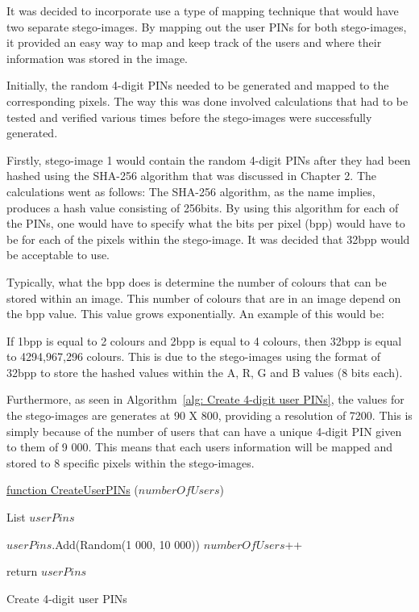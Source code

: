 It was decided to incorporate use a type of mapping technique that would have two separate stego-images. By mapping out the user PINs for both stego-images, it provided an easy way to map and keep track of the users and where their information was stored in the image. 

Initially, the random 4-digit PINs needed to be generated and mapped to the corresponding pixels. The way this was done involved calculations that had to be tested and verified various times before the stego-images were successfully generated. 

Firstly, stego-image 1 would contain the random 4-digit PINs after they had been hashed using the SHA-256 algorithm that was discussed in Chapter 2. The calculations went as follows:
The SHA-256 algorithm, as the name implies, produces a hash value consisting of 256bits. 
By using this algorithm for each of the PINs, one would have to specify what the bits per pixel (bpp) would have to be for each of the pixels within the stego-image. It was decided that 32bpp would be acceptable to use. 

Typically, what the bpp does is determine the number of colours that can be stored within an image. This number of colours that are in an image depend on the bpp value. This value grows exponentially. An example of this would be: 

If 1bpp is equal to 2 colours and 2bpp is equal to 4 colours, then 32bpp is equal to 4294,967,296 colours. This is due to the stego-images using the format of 32bpp to store the hashed values within the A, R, G and B values (8 bits each).

Furthermore, as seen in Algorithm~\ref{alg: Create 4-digit user PINs}, the values for the stego-images are generates at 90 X 800, providing a resolution of 7200. This is simply because of the number of users that can have a unique 4-digit PIN given to them of 9 000. This means that each users information will be mapped and stored to 8 specific pixels within the stego-images. 



\begin{algorithm}
     
     \underline{function CreateUserPINs} ($numberOfUsers$)\;
     
     List $userPins$ \;
     
     {
        $userPins$.Add(Random(1 000, 10 000))\;
        $numberOfUsers$++\;
     }
     
     return $userPins$\;
     \caption{Create 4-digit user PINs}
     \label{alg: Create 4-digit user PINs}
     
\end{algorithm}

